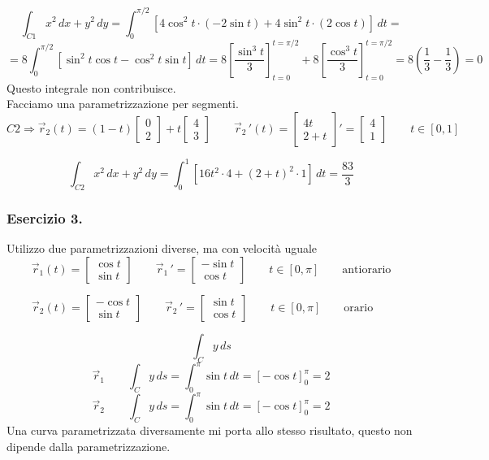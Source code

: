 \documentclass[10pt]{article}
\theoremstyle{plain}
\theoremstyle{definition}
\begin{document}
$$\int_{C1} x^2\,dx +y^2\,dy = \int_0^{\pi/2} [4\cos ^2 t \cdot (-2\sin t) + 4\sin ^2 t \cdot (2\cos t)]\,dt =$$
$$= 8 \int_0^{\pi/2} [\sin ^2 t \cos t - \cos ^2 t \sin t]\,dt = 8 \left[ \frac{\sin ^3 t}{3} \right]_{t=0}^{t=\pi/2} +8 \left[ \frac{\cos ^3 t}{3} \right]_{t=0}^{t=\pi/2} = 8 \left( \frac{1}{3} - \frac{1}{3}\right) = 0$$
Questo integrale non contribuisce.\\
Facciamo una parametrizzazione per segmenti.
$$C2 \Rightarrow \vec{r}_2 (t) = (1-t) \begin{bmatrix} 0 \\ 2\end{bmatrix} +t \begin{bmatrix} 4 \\ 3\end{bmatrix} \qquad \vec{r}_2 \,' (t) = \begin{bmatrix} 4t \\ 2+t\end{bmatrix}' = \begin{bmatrix} 4 \\ 1\end{bmatrix} \qquad t \in [0,1] $$

$$\int_{C2} x^2 \,dx + y^2 \,dy = \int_0^1 [16t^2 \cdot 4 + (2+t)^2 \cdot 1]\,dt = \frac{83}{3}$$

\subsubsection{Esercizio 3.}

Utilizzo due parametrizzazioni diverse, ma con velocità uguale
$$\vec{r}_1 (t) = \begin{bmatrix} \cos t \\ \sin t\end{bmatrix} \qquad \vec{r}_1\,' = \begin{bmatrix} -\sin t \\ \cos t\end{bmatrix} \qquad t \in [0,\pi] \qquad \text{antiorario}$$

$$\vec{r}_2 (t) = \begin{bmatrix} -\cos t \\ \sin t\end{bmatrix} \qquad \vec{r}_2\,' = \begin{bmatrix} \sin t \\ \cos t\end{bmatrix} \qquad t \in [0,\pi] \qquad \text{orario}\quad \;\;$$

$$\int_C y\,ds$$
$$\vec{r}_1 \qquad \int_C y\,ds = \int_0^{\pi} \sin t \,dt =[ -\cos t ]_0^{\pi} =2$$
$$\vec{r}_2 \qquad \int_C y\,ds = \int_0^{\pi} \sin t \,dt =[ -\cos t ]_0^{\pi} =2$$
Una curva parametrizzata diversamente mi porta allo stesso risultato, questo non dipende dalla parametrizzazione.
\end{document}

